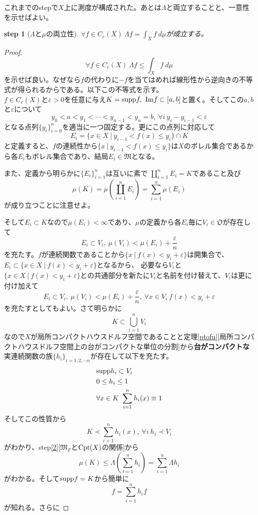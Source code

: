 \documentclass[leqno]{jsarticle}
\newtheorem{stp}{{\bf step}}
\newcommand{\mgn}{\infty}
\newcommand{\dpst}{\displaystyle}
\newcommand{\supp}{\text{{\rm supp}}}
\newcommand{\mm}{\mathfrak{M}}
\newcommand{\mf}{\mathfrak{M}_F}
\newcommand{\la}{\Lambda}
\newcommand{\ep}{\varepsilon}
\newcommand{\cpt}{{\rm Cpt}(X)}
\newcommand{\oo}{\mathfrak{O}}
\newcommand{\fnct}{C_c(X)}
\begin{document}
これまでのstepで$X$上に測度が構成された。あとは$\la$と両立することと、一意性を示せばよい。
\begin{stp}[$\la$と$\mu$の両立性]\label{12}
$\dpst \forall f\in \fnct\ \la f=\int_Xf\ d\mu$が成立する。
\end{stp}
\begin{proof}
\[
\forall f\in \fnct\ \la f\le \int_Xf\ d\mu
\]
を示せば良い。なぜなら$f$の代わりに$-f$を当てはめれば線形性から逆向きの不等式が得られるからである。以下この不等式を示す。\\ 
$f\in \fnct$と$\ep>0$を任意に与え$K=\supp f,\ \text{{\rm Im}}f\subset [a,b]$と置く。そしてこの$a,b$と$\ep$について
\[
y_0<a<y_1<\cdots <y_{n-1}<y_n=b,\ \forall i\ y_i-y_{i-1}<\ep
\]
となる点列$\{y_i\}_{i=0}^n$を適当に一つ固定する。更にこの点列に対応して
\[
E_i=\{x\in X\ |\ y_{i-1}<f(x)\le y_i\}\cap K
\]
と定義すると、$f$の連続性から$\{x\ |\ y_{i-1}<f(x)\le y_i\}$は$X$のボレル集合であるから各$E_i$もボレル集合であり、結局$E_i\in \mm$となる。\par
また、定義から明らかに$\{E_i\}_{i=1}^n$は互いに素で
$\dpst \coprod_{i=1}^nE_i=K$であること及び
\[
\mu(K)=\mu\left(\coprod_{i=1}^nE_i\right)=\sum_{i=1}^n\mu(E_i)
\]
が成り立つことに注意せよ。\par
そして$E_i\subset K$なので$\mu(E_i)<\mgn$であり、$\mu$の定義から各$E_i$毎に$V_i\in\oo$が存在して
\[
E_i\subset V_i,\ \mu(V_i)<\mu(E_i)+\frac{\ep}{n}
\]
を充たす。$f$が連続関数であることから$\{x\ |\ f(x)<y_i+\ep\}$は開集合で、$E_i\subset \{x\in X\ |\ f(x)<y_i+\ep\}$となるから、
必要なら$V_i$と$\{x\in X\ |\ f(x)<y_i+\ep\}$との共通部分を新たに$V_i$と名前を付け替えて、$V_i$は更に付け加えて
\[
E_i\subset V_i,\ \mu(V_i)<\mu(E_i)+\frac{\ep}{n},\ \forall x\in V_i\ f(x)<y_i+\ep
\]
を充たすとしてもよい。さて明らかに
\[
K\subset \bigcup_{i=1}^nV_i
\]
なので$X$が局所コンパクトハウスドルフ空間であることと定理\ref{ptofu}[局所コンパクトハウスドルフ空間上の台がコンパクトな単位の分割]から\textbf{台がコンパクトな}実連続関数の族$\{h_i\}_{i=1,2,\cdots n}$が存在して以下を充たす。
\begin{eqnarray*}
&\supp h_i\subset V_i\\ 
&0\le h_i \le1\\ 
&\forall x\in K\ \sum_{i=1}^{n}h_i(x)\equiv 1
\end{eqnarray*}
そしてこの性質から
\[
K\prec \sum_{i=1}^{n}h_i(x),\ \forall i \ h_i\prec V_i
\]
がわかり、step\ref{2}[$\mf$と$\cpt$の関係]から
\[
\mu(K)\le \la\left(\sum_{i=1}^{n}h_i\right)=\sum_{i=1}^n\la h_i
\]
がわかる。そして$\supp f=K$から簡単に
\[
f=\sum_{i=1}^nh_if
\]
が知れる。さらに

\end{proof}
\end{document}
